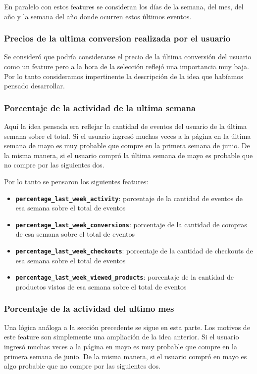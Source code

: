 \documentclass[a4paper]{article}
\begin{document}
En paralelo con estos features se consideran los días de la semana, del mes, del año y la semana del año donde ocurren estos últimos eventos.	
	
\subsubsection{Precios de la ultima conversion realizada por el usuario}

Se consideró que podría considerarse el precio de la última conversión del usuario como un feature pero a la hora de la selección reflejó una importancia muy baja. Por lo tanto consideramos impertinente la descripción de la idea que habíamos pensado desarrollar.

\subsubsection{Porcentaje de la actividad de la ultima semana}

Aquí la idea pensada era reflejar la cantidad de eventos del usuario de la última semana sobre el total. Si el usuario ingresó muchas veces a la página en la última semana de mayo es muy probable que compre en la primera semana de junio. De la misma manera, si el usuario compró la última semana de mayo es probable que no compre por las siguientes dos.

Por lo tanto se pensaron los siguientes features:

\begin{itemize}
	\item \textbf{\texttt{percentage\_last\_week\_activity}}: porcentaje de la cantidad de eventos de esa semana sobre el total de eventos
	\item \textbf{\texttt{percentage\_last\_week\_conversions}}:  porcentaje de la cantidad de compras de esa semana sobre el total de eventos
	\item \textbf{\texttt{percentage\_last\_week\_checkouts}}: porcentaje de la cantidad de checkouts de esa semana sobre el total de eventos
	\item \textbf{\texttt{percentage\_last\_week\_viewed\_products}}: porcentaje de la cantidad de productos vistos de esa semana sobre el total de eventos
\end{itemize}


\subsubsection{Porcentaje de la actividad del ultimo mes}
Una lógica análoga a la sección precedente se sigue en esta parte. Los motivos de este feature son simplemente una ampliación de la idea anterior. Si el usuario ingresó muchas veces a la página en mayo es muy probable que compre en la primera semana de junio. De la misma manera, si el usuario compró en mayo es algo probable que no compre por las siguientes dos.
\end{document}
